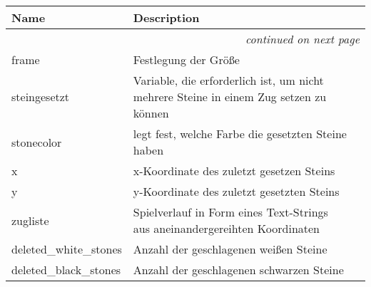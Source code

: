     \vspace{-1cm}
\hspace{\varindent}\begin{longtable}{|p{\varnamewidth}|p{\vardescrwidth}|l}
\cline{1-2}
\cline{1-2} \centering \textbf{Name} & \centering \textbf{Description}& \\
\cline{1-2}
\endhead\cline{1-2}\multicolumn{3}{r}{\small\textit{continued on next page}}\\\endfoot\cline{1-2}
\endlastfoot\raggedright f\-r\-a\-m\-e\- & Festlegung der Größe&\\
\cline{1-2}
\raggedright s\-t\-e\-i\-n\-g\-e\-s\-e\-t\-z\-t\- & Variable, die erforderlich ist, um nicht mehrere Steine in einem 
          Zug setzen zu können&\\
\cline{1-2}
\raggedright s\-t\-o\-n\-e\-c\-o\-l\-o\-r\- & legt fest, welche Farbe die gesetzten Steine haben&\\
\cline{1-2}
\raggedright x\- & x-Koordinate des zuletzt gesetzen Steins&\\
\cline{1-2}
\raggedright y\- & y-Koordinate des zuletzt gesetzten Steins&\\
\cline{1-2}
\raggedright z\-u\-g\-l\-i\-s\-t\-e\- & Spielverlauf in Form eines Text-Strings aus aneinandergereihten 
          Koordinaten&\\
\cline{1-2}
\raggedright d\-e\-l\-e\-t\-e\-d\-\_\-w\-h\-i\-t\-e\-\_\-s\-t\-o\-n\-e\-s\- & Anzahl der geschlagenen  weißen Steine&\\
\cline{1-2}
\raggedright d\-e\-l\-e\-t\-e\-d\-\_\-b\-l\-a\-c\-k\-\_\-s\-t\-o\-n\-e\-s\- & Anzahl der geschlagenen schwarzen Steine&\\
\cline{1-2}
\end{longtable}

